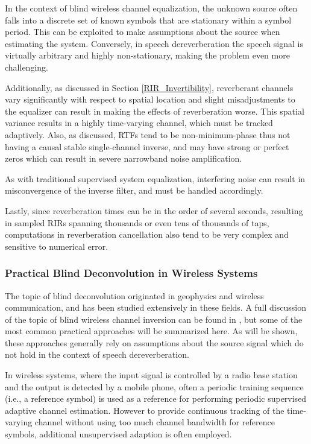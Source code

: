 In the context of blind wireless channel equalization, the unknown source often falls into a discrete set of known symbols that are stationary within a symbol period. This can be exploited to make assumptions about the source when estimating the system. Conversely, in speech dereverberation the speech signal is virtually arbitrary and highly non-stationary, making the problem even more challenging.

Additionally, as discussed in Section \ref{RIR_Invertibility}, reverberant channels vary significantly with respect to spatial location and slight misadjustments to the equalizer can result in making the effects of reverberation worse. This spatial variance results in a highly time-varying channel, which must be tracked adaptively. Also, as discussed, RTFs tend to be non-minimum-phase thus not having a causal stable single-channel inverse, and may have strong or perfect zeros which can result in severe narrowband noise amplification.

As with traditional supervised system equalization, interfering noise can result in misconvergence of the inverse filter, and must be handled accordingly.

Lastly, since reverberation times can be in the order of several seconds, resulting in sampled RIRs spanning thousands or even tens of thousands of taps, computations in reverberation cancellation also tend to be very complex and sensitive to numerical error.

\subsubsection{Practical Blind Deconvolution in Wireless Systems}

The topic of blind deconvolution originated in geophysics and wireless communication, and has been studied extensively in these fields. A full discussion of the topic of blind wireless channel inversion can be found in \cite{ding2018blind}, but some of the most common practical approaches will be summarized here. As will be shown, these approaches generally rely on assumptions about the source signal which do not hold in the context of speech dereverberation.

In wireless systems, where the input signal is controlled by a radio base station and the output is detected by a mobile phone, often a periodic training sequence (i.e., a reference symbol) is used as a reference for performing periodic supervised adaptive channel estimation. However to provide continuous tracking of the time-varying channel without using too much channel bandwidth for reference symbols, additional unsupervised adaption is often employed.

